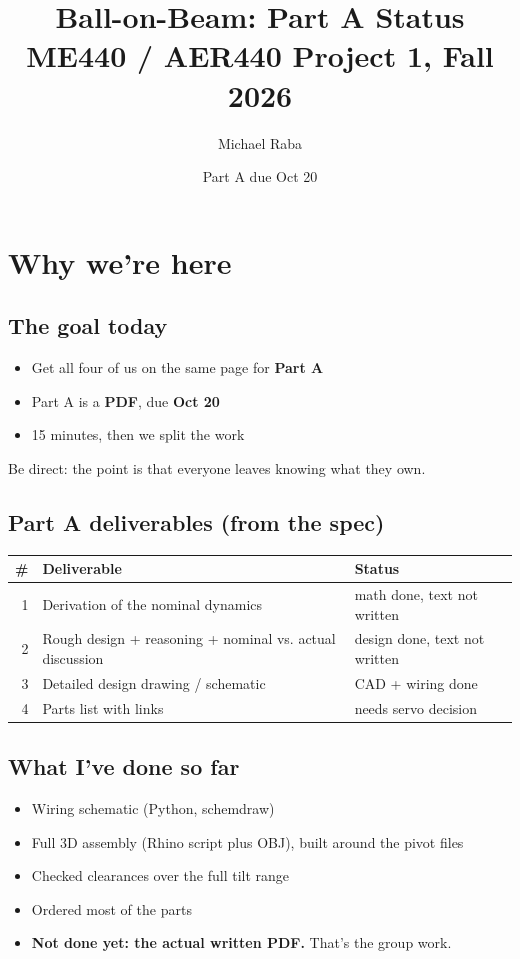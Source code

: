 \documentclass[11pt]{article}
\author{Michael Raba}
\date{Part A due Oct 20}
\title{Ball-on-Beam: Part A Status\\\medskip
\large ME440 / AER440 Project 1, Fall 2026}
\begin{document}
\maketitle
\section*{Why we're here}
\label{sec:orgfe8d3f9}
\subsection*{The goal today}
\label{sec:org08826be}
\begin{itemize}
\item Get all four of us on the same page for \textbf{Part A}
\item Part A is a \textbf{PDF}, due \textbf{Oct 20}
\item 15 minutes, then we split the work
\end{itemize}
\begin{NOTES}
Be direct: the point is that everyone leaves knowing what they own.
\end{NOTES}
\subsection*{Part A deliverables (from the spec)}
\label{sec:org22c4906}
\begin{center}
\begin{tabular}{rll}
\# & Deliverable & Status\\
\hline
1 & Derivation of the nominal dynamics & math done, text not written\\
2 & Rough design + reasoning + nominal vs. actual discussion & design done, text not written\\
3 & Detailed design drawing / schematic & CAD + wiring done\\
4 & Parts list with links & needs servo decision\\
\end{tabular}
\end{center}
\subsection*{What I've done so far}
\label{sec:orga694dd0}
\begin{itemize}
\item Wiring schematic (Python, schemdraw)
\item Full 3D assembly (Rhino script plus OBJ), built around the pivot files
\item Checked clearances over the full tilt range
\item Ordered most of the parts
\item \textbf{Not done yet: the actual written PDF.} That's the group work.
\end{itemize}
\end{document}
